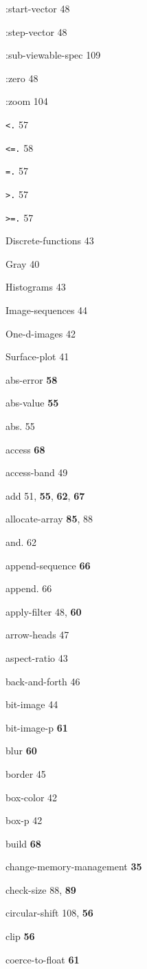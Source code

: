\begin{theindex}
\item :start-vector 48
\item :step-vector 48
\item :sub-viewable-spec 109
\item :zero 48
\item :zoom 104
\item {\tt <.} 57
\item {\tt <=.} 58
\item {\tt =.} 57
\item {\tt >.} 57
\item {\tt >=.} 57
\item Discrete-functions 43
\item Gray 40
\item Histograms 43
\item Image-sequences 44
\item One-d-images 42
\item Surface-plot 41
\item abs-error {\bf 58}
\item abs-value {\bf 55}
\item abs. 55
\item access {\bf 68}
\item access-band 49
\item add 51, {\bf 55}, {\bf 62}, {\bf 67}
\item allocate-array {\bf 85}, 88
\item and. 62
\item append-sequence {\bf 66}
\item append. 66
\item apply-filter 48, {\bf 60}
\item arrow-heads 47
\item aspect-ratio 43
\item back-and-forth 46
\item bit-image 44
\item bit-image-p {\bf 61}
\item blur {\bf 60}
\item border 45
\item box-color 42
\item box-p 42
\item build {\bf 68}
\item change-memory-management {\bf 35}
\item check-size 88, {\bf 89}
\item circular-shift 108, {\bf 56}
\item clip {\bf 56}
\item coerce-to-float {\bf 61}

\end{theindex}

